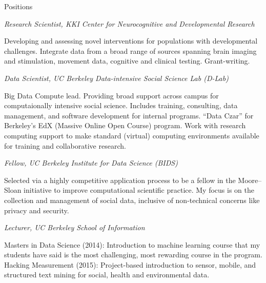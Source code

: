 \begin{rubric}{Positions}

\entry*[2016--2017] \emph{Research Scientist, KKI Center for Neurocognitive
        and Developmental Research}
\par Developing and assessing novel interventions for populations with
developmental challenges. Integrate data from a broad range of sources
spanning brain imaging and stimulation, movement data, cognitive and
clinical testing. Grant-writing.

\entry*[2013--2016] \emph{Data Scientist, UC Berkeley Data-intensive Social
    Science Lab (D-Lab)}
\par Big Data Compute lead. Providing broad support across campus for
computaionally intensive social science. Includes training, consulting, data
management, and software development for internal programs. “Data Czar” for
Berkeley's EdX (Massive Online Open Course) program. Work with research
computing support to make standard (virtual) computing environments available
for training and collaborative research.

\entry*[2014--2016] \emph{Fellow, UC Berkeley Institute for Data Science
    (BIDS)}
\par Selected via a highly competitive application process to be a fellow in the
Moore--Sloan initiative to improve computational scientific practice. My focus
is on the collection and management of social data, inclusive of non-technical
concerns like privacy and security.

\entry*[2014, 2015] \emph{Lecturer, UC Berkeley School of Information} 
\par Masters in Data Science (2014): Introduction to machine learning course
that my students have said is the most challenging, most rewarding course in
the program. Hacking Measurement (2015): Project-based introduction to sensor,
mobile, and structured text mining for social, health and environmental data.

\end{rubric}
